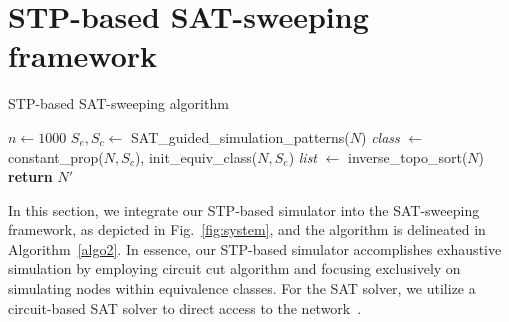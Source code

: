 \documentclass[conference]{IEEEtran}
\begin{document}
\section{STP-based SAT-sweeping framework}
\label{sec4}
\begin{algorithm}[t]
  \SetAlgoLined
  \LinesNumbered %
  \caption{STP-based SAT-sweeping algorithm}
  \label{algo2}
  $n \leftarrow 1000$ \;
  $S_e,S_c \leftarrow$ SAT\_guided\_simulation\_patterns($N$)\;
  \emph{class} $\leftarrow$ constant\_prop($N,S_c$), init\_equiv\_class($N,S_e$)\;
  \emph{list}  $\leftarrow$ inverse\_topo\_sort($N$)\;
  \textbf{return} $N'$\;
\end{algorithm}

In this section, we integrate our STP-based simulator into the SAT-sweeping framework, as depicted in Fig.~\ref{fig:system}, and the algorithm is delineated in Algorithm~\ref{algo2}.
In essence, our STP-based simulator accomplishes exhaustive simulation by employing circuit cut algorithm and focusing exclusively on simulating nodes within equivalence classes.
For the SAT solver, we utilize a circuit-based SAT solver to direct access to the network~\cite{sweep3}.
\end{document}

